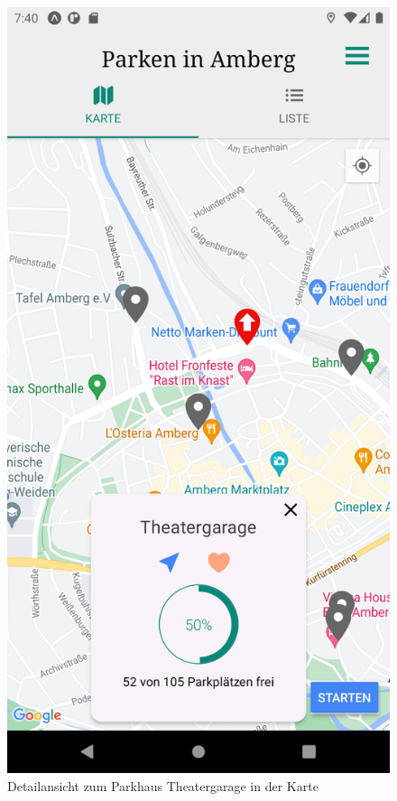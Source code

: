\begin{figure}
	\vspace{-\baselineskip}
	\centering
	\includegraphics[scale=0.15]{img/detail_map}
	\caption{Detailansicht zum Parkhaus Theatergarage in der Karte}
	\label{fig:detail_map}
\end{figure}
